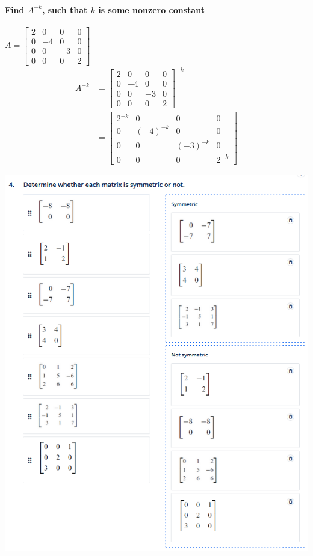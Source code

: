 \documentclass[
  letterpaper,
  DIV=11,
  numbers=noendperiod]{scrartcl}
\let\oldparagraph\paragraph
\renewcommand{\paragraph}[1]{\oldparagraph{#1}\mbox{}}
\begin{document}
\newpage{}

\paragraph{\texorpdfstring{Find \(A^{-k}\), such that \(k\) is some
nonzero
constant}{Find A\^{}\{-k\}, such that k is some nonzero constant}}\label{find-a-k-such-that-k-is-some-nonzero-constant}

\(A=\begin{bmatrix}2 & 0 & 0 & 0 \\ 0 & -4 & 0 & 0 \\ 0 & 0 & -3 & 0 \\ 0 & 0 & 0 & 2 \end{bmatrix}\)
\begin{align*}
A^{-k} &= \begin{bmatrix}2 & 0 & 0 & 0 \\ 0 & -4 & 0 & 0 \\ 0 & 0 & -3 & 0 \\ 0 & 0 & 0 & 2 \end{bmatrix}^{-k} \\
&= \begin{bmatrix}2^{-k} & 0 & 0 & 0 \\ 0 & (-4)^{-k} & 0 & 0 \\ 0 & 0 & (-3)^{-k} & 0 \\ 0 & 0 & 0 & 2^{-k} \end{bmatrix}
\end{align*}

\includegraphics{img/symmetric-or-not.png}
\end{document}
